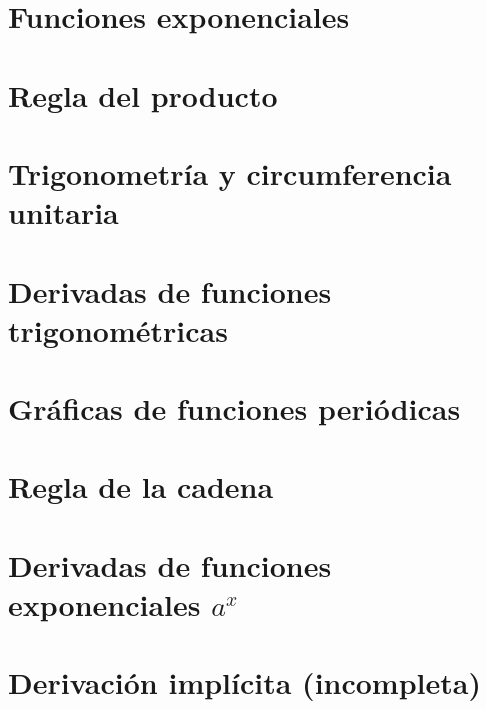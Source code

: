 \documentclass{book}
\begin{document}
\chapter{Funciones exponenciales}


\chapter{Regla del producto}


\chapter{Trigonometría y circumferencia unitaria}



\chapter{Derivadas de funciones trigonométricas}


\chapter{Gráficas de funciones periódicas}


\chapter{Regla de la cadena}


\chapter{Derivadas de funciones exponenciales $a^{x}$}


\chapter{Derivación implícita (incompleta)}

\end{document}
